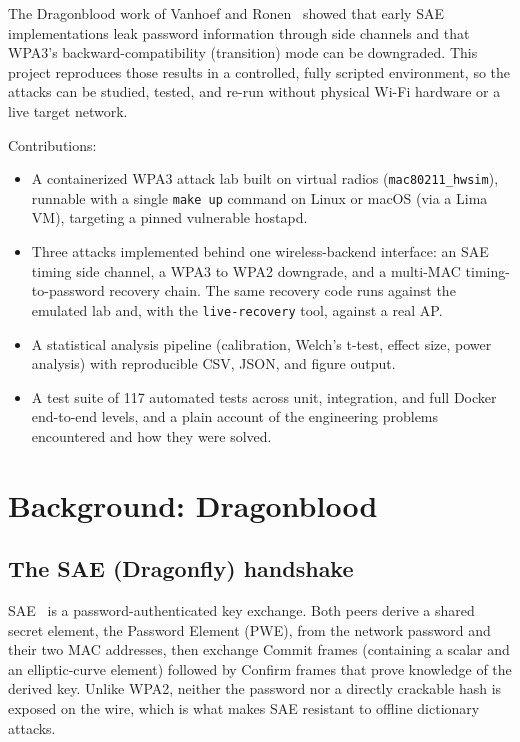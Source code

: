 \documentclass[11pt,letterpaper]{article}
\newcommand{\code}[1]{\texttt{\small #1}}
\begin{document}
The Dragonblood work of Vanhoef and Ronen~\cite{vanhoef2020dragonblood} showed
that early SAE implementations leak password information through side channels
and that WPA3's backward-compatibility (transition) mode can be downgraded. This
project reproduces those results in a controlled, fully scripted environment, so
the attacks can be studied, tested, and re-run without physical Wi-Fi hardware
or a live target network.

Contributions:
\begin{itemize}
  \item A containerized WPA3 attack lab built on virtual radios
    (\code{mac80211\_hwsim}), runnable with a single \code{make up} command on
    Linux or macOS (via a Lima VM), targeting a pinned vulnerable hostapd.
  \item Three attacks implemented behind one wireless-backend interface: an SAE
    timing side channel, a WPA3 to WPA2 downgrade, and a multi-MAC
    timing-to-password recovery chain. The same recovery code runs against the
    emulated lab and, with the \code{live-recovery} tool, against a real AP.
  \item A statistical analysis pipeline (calibration, Welch's t-test, effect
    size, power analysis) with reproducible CSV, JSON, and figure output.
  \item A test suite of 117 automated tests across unit, integration, and full
    Docker end-to-end levels, and a plain account of the engineering problems
    encountered and how they were solved.
\end{itemize}

\section{Background: Dragonblood}
\label{sec:background}

\subsection{The SAE (Dragonfly) handshake}
SAE~\cite{ieee80211_2016,rfc7664} is a password-authenticated key exchange. Both
peers derive a shared secret element, the Password Element (PWE), from the
network password and their two MAC addresses, then exchange Commit frames
(containing a scalar and an elliptic-curve element) followed by Confirm frames
that prove knowledge of the derived key. Unlike WPA2, neither the password nor a
directly crackable hash is exposed on the wire, which is what makes SAE resistant
to offline dictionary attacks.
\end{document}
